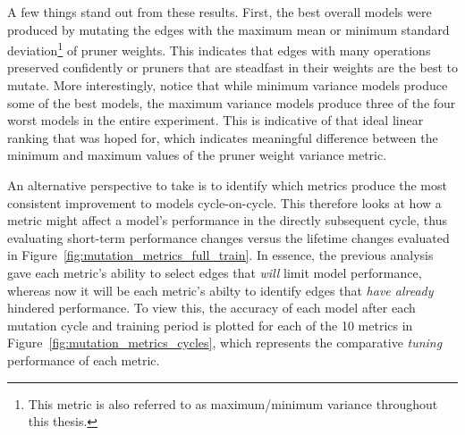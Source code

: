 A few things stand out from these results. First, the best overall models were produced by mutating the edges with the
maximum mean or minimum standard deviation\footnote{This metric is also referred to as maximum/minimum variance throughout this thesis.}
of pruner weights. This indicates that edges with many operations preserved
confidently or pruners that are steadfast in their weights are the best to mutate. More interestingly, notice that
while minimum variance models produce some of the best models, the maximum variance models produce
three of the four worst models in the entire experiment. This is indicative of that ideal linear ranking that was hoped
for, which indicates meaningful difference between the minimum and maximum values of the pruner weight variance metric.

An alternative perspective to take is to identify which metrics produce the most consistent improvement to models
cycle-on-cycle. This therefore looks at how a metric might affect a model's performance in the directly subsequent cycle,
thus evaluating short-term performance changes versus the lifetime changes evaluated in
Figure~\ref{fig:mutation_metrics_full_train}. In essence, the previous analysis gave each metric's ability to select edges
that \textit{will} limit model performance, whereas now it will be each metric's abilty to identify edges that \textit{have already}
hindered performance. To view this, the accuracy of each model after each mutation cycle and training period is plotted for
each of the 10 metrics in Figure~\ref{fig:mutation_metrics_cycles}, which represents the comparative
\textit{tuning} performance of each metric.


